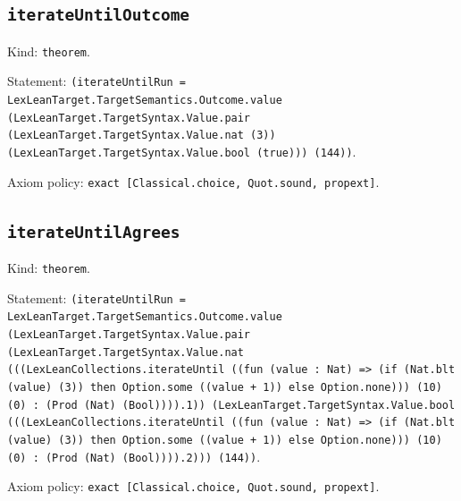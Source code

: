 \documentclass[11pt]{article}
\begin{document}
\subsection*{\texttt{iterateUntilOutcome}}
\noindent Kind: \texttt{theorem}.\par
\noindent Statement: \texttt{(iterateUntilRun = LexLeanTarget.TargetSemantics.Outcome.value (LexLeanTarget.TargetSyntax.Value.pair (LexLeanTarget.TargetSyntax.Value.nat (3)) (LexLeanTarget.TargetSyntax.Value.bool (true))) (144))}.\par
\noindent Axiom policy: \texttt{exact [Classical.choice, Quot.sound, propext]}.\par
\subsection*{\texttt{iterateUntilAgrees}}
\noindent Kind: \texttt{theorem}.\par
\noindent Statement: \texttt{(iterateUntilRun = LexLeanTarget.TargetSemantics.Outcome.value (LexLeanTarget.TargetSyntax.Value.pair (LexLeanTarget.TargetSyntax.Value.nat (((LexLeanCollections.iterateUntil ((fun (value : Nat) => (if (Nat.blt (value) (3)) then Option.some ((value + 1)) else Option.none))) (10) (0) : (Prod (Nat) (Bool)))).1)) (LexLeanTarget.TargetSyntax.Value.bool (((LexLeanCollections.iterateUntil ((fun (value : Nat) => (if (Nat.blt (value) (3)) then Option.some ((value + 1)) else Option.none))) (10) (0) : (Prod (Nat) (Bool)))).2))) (144))}.\par
\noindent Axiom policy: \texttt{exact [Classical.choice, Quot.sound, propext]}.\par
\end{document}
